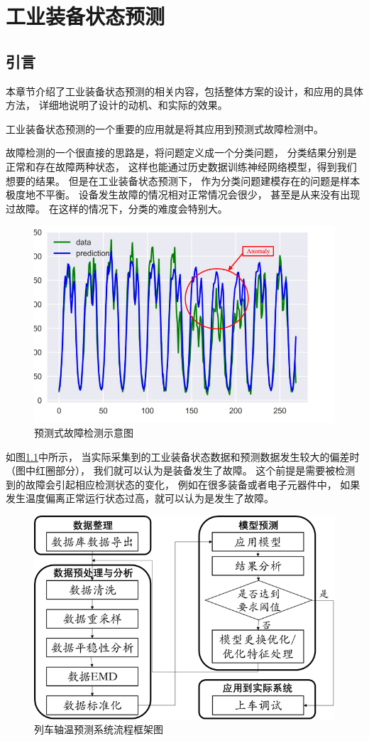 

\chapter{工业装备状态预测}\label{chapter4}
\section{引言}
本章节介绍了工业装备状态预测的相关内容，包括整体方案的设计，和应用的具体方法，
详细地说明了设计的动机、和实际的效果。

工业装备状态预测的一个重要的应用就是将其应用到预测式故障检测中。

故障检测的一个很直接的思路是，将问题定义成一个分类问题，
分类结果分别是正常和存在故障两种状态，
这样也能通过历史数据训练神经网络模型，得到我们想要的结果。
但是在工业装备状态预测下，
作为分类问题建模存在的问题是样本极度地不平衡。
设备发生故障的情况相对正常情况会很少，
甚至是从来没有出现过故障。
在这样的情况下，分类的难度会特别大。

\begin{figure}
    \centering
    \includegraphics[width=0.6\linewidth]{figures/预测式故障检测}
    \caption{预测式故障检测示意图}
    \label{fig:prediction-fault-detection}
\end{figure}

如图\ref{fig:prediction-fault-detection}中所示，
当实际采集到的工业装备状态数据和预测数据发生较大的偏差时（图中红圈部分），
我们就可以认为是装备发生了故障。
这个前提是需要被检测到的故障会引起相应检测状态的变化，
例如在很多装备或者电子元器件中，
如果发生温度偏离正常运行状态过高，就可以认为是发生了故障。

\begin{figure}
  \centering
  \includegraphics[width=0.8\linewidth]{figures/列车轴温预测系统流程框架图.png}
  \caption{列车轴温预测系统流程框架图}
  \label{fig:prediction_system}
\end{figure}

